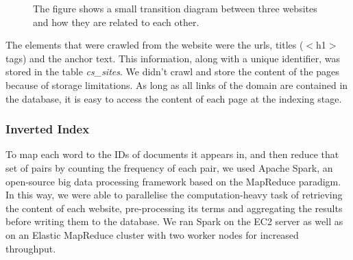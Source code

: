 \begin{figure}[!h]
\centering
{}
\caption{The figure shows a small transition diagram between three websites and how they are related to each other.}
\label{fig:graph}
\end{figure}

The elements that were crawled from the website were the urls, titles ($<$h1$>$ tags) and the anchor text. This information, along with a unique identifier, was stored in the table \emph{cs\_sites}. We didn't crawl and store the content of the pages because of storage limitations. As long as all links of the domain are contained in the database, it is easy to access the content of each page at the indexing stage.


\subsubsection{Inverted Index} %
\label{ssub:inverted_index}

To map each word to the IDs of documents it appears in, and then reduce that set of pairs by counting the frequency of each pair, we used Apache Spark, an open-source big data processing framework based on the MapReduce paradigm. In this way, we were able to parallelise the computation-heavy task of retrieving the content of each website, pre-processing its terms and aggregating the results before writing them to the database. We ran Spark on the EC2 server as well as on an Elastic MapReduce cluster with two worker nodes for increased throughput.


